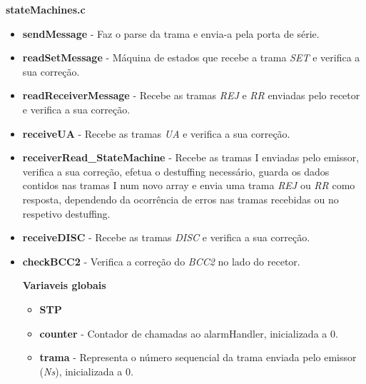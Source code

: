 \documentclass{article}
\begin{document}
\bigskip

\textbf{stateMachines.c}
\begin{itemize}
	\item \textbf{sendMessage } - Faz o parse da trama e envia-a pela porta de série.
	\item \textbf{readSetMessage } -  Máquina de estados que recebe a trama \textit{SET} e verifica a sua correção.
	\item \textbf{readReceiverMessage } - Recebe as tramas \textit{REJ} e \textit{RR} enviadas pelo recetor e verifica a sua correção.
	\item \textbf{receiveUA} - Recebe as tramas \textit{UA} e verifica a sua correção.
	
	\item \textbf{receiverRead\_StateMachine} - Recebe as tramas I enviadas pelo emissor, verifica a sua correção, efetua o destuffing necessário, guarda os dados contidos nas tramas I num novo array e envia uma trama \textit{REJ} ou \textit{RR} como resposta, dependendo da ocorrência de erros nas tramas recebidas ou no respetivo destuffing.
	\item \textbf{receiveDISC } - Recebe as tramas \textit{DISC} e verifica a sua correção.
	\item \textbf{checkBCC2 } - Verifica a correção do \textit{BCC2} no lado do recetor.
	
	\textbf{Variaveis globais}
	\begin{itemize}
		\item \textbf{STP}
		\item \textbf{counter} - Contador de chamadas ao alarmHandler, inicializada a 0.
		\item \textbf{trama} - Representa o número sequencial da trama enviada pelo emissor (\textit{Ns}), inicializada a 0.
	\end{itemize}
\end{itemize}

\bigskip
\end{document}
